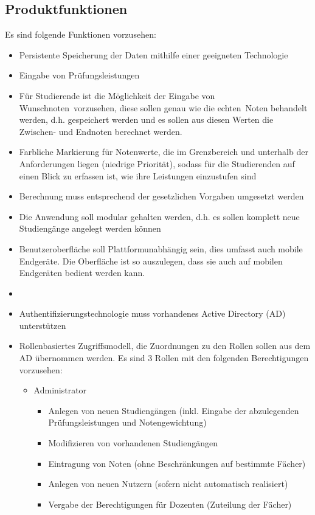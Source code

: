 \documentclass[12pt,a4paper,parskip]{scrreprt}
\begin{document}
\subsection{Produktfunktionen}
Es sind folgende Funktionen vorzusehen:
\begin{itemize}
\item Persistente Speicherung der Daten mithilfe einer geeigneten Technologie
\item Eingabe von Prüfungsleistungen
\item Für Studierende ist die Möglichkeit der Eingabe von \glqq Wunschnoten\grqq\ vorzusehen, diese sollen genau wie die \glqq echten\grqq\ Noten behandelt werden, d.h. gespeichert werden und es sollen aus diesen Werten die Zwischen- und Endnoten berechnet werden.
\item Farbliche Markierung für Notenwerte, die im Grenzbereich und unterhalb der Anforderungen liegen (niedrige Priorität), sodass für die Studierenden auf einen Blick zu erfassen ist, wie ihre Leistungen einzustufen sind
\item Berechnung muss entsprechend der gesetzlichen Vorgaben umgesetzt werden
\item Die Anwendung soll modular gehalten werden, d.h. es sollen komplett neue Studiengänge angelegt werden können
\item Benutzeroberfläche soll Plattformunabhängig sein, dies umfasst auch mobile Endgeräte. Die Oberfläche ist so auszulegen, dass sie auch auf mobilen Endgeräten bedient werden kann.
\item 
\item Authentifizierungstechnologie muss vorhandenes Active Directory (AD) unterstützen
\item Rollenbasiertes Zugriffsmodell, die Zuordnungen zu den Rollen sollen aus dem AD übernommen werden. 
Es sind 3 Rollen mit den folgenden Berechtigungen vorzusehen:
\begin{itemize}
\item Administrator
\begin{itemize}
\item Anlegen von neuen Studiengängen (inkl. Eingabe der abzulegenden Prüfungsleistungen und Notengewichtung)
\item Modifizieren von vorhandenen Studiengängen
\item Eintragung von Noten (ohne Beschränkungen auf bestimmte Fächer)
\item Anlegen von neuen Nutzern (sofern nicht automatisch realisiert)
\item Vergabe der Berechtigungen für Dozenten (Zuteilung der Fächer)

\end{itemize}
\end{itemize}
\end{itemize}
\end{document}

